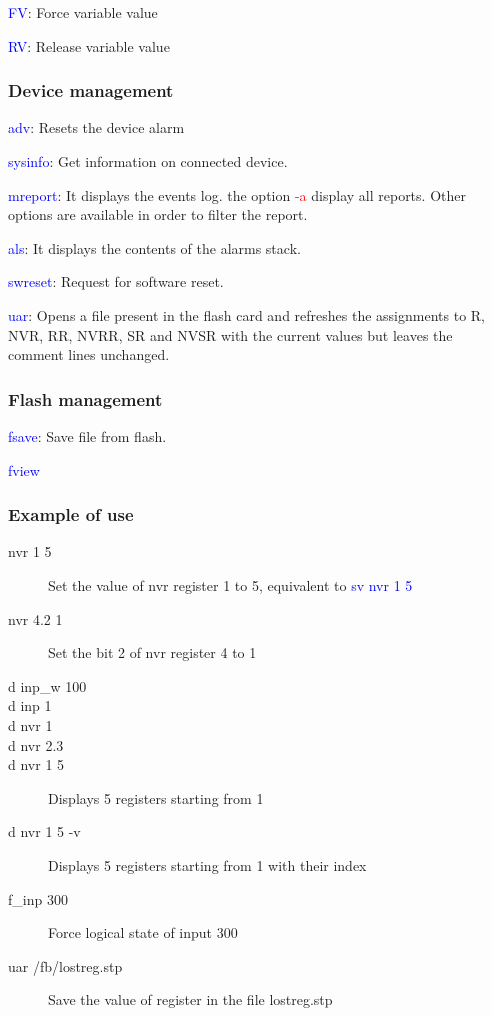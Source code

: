\textcolor{blue}{FV}: Force variable value

\textcolor{blue}{RV}: Release variable value

\subsubsection{Device management}
\textcolor{blue}{adv}: Resets the device alarm

\textcolor{blue}{sysinfo}: Get information on connected device.

\textcolor{blue}{mreport}: It displays the events log. the option \textcolor{red}{-a} display all reports. Other options are available in order to filter the report.

\textcolor{blue}{als}: It displays the contents of the alarms stack.

\textcolor{blue}{swreset}: Request for software reset.

\textcolor{blue}{uar}: Opens a file present in the flash card and refreshes the assignments to  R, NVR, RR, NVRR, SR and NVSR with the current values but leaves the comment lines unchanged.

\subsubsection{Flash management}
\textcolor{blue}{fsave}: Save file from flash.

\textcolor{blue}{fview}

\subsubsection{Example of use}

\begin{description}
	\item[nvr 1 5] Set the value of nvr register 1 to 5, equivalent to \textcolor{blue}{sv nvr 1 5}
	\item[nvr 4.2 1] Set the bit 2 of nvr register 4 to 1
	\item[d inp\_w 100]
	\item[d inp 1]
	\item[d nvr 1]
	\item [d nvr 2.3]
	\item [d nvr 1 5] Displays 5 registers starting from 1
	\item [d nvr 1 5 -v]  Displays 5 registers starting from 1 with their index
	\item[f\_inp 300] Force logical state of input 300
	\item[uar /fb/lostreg.stp] Save the value of register in the file lostreg.stp
\end{description}

